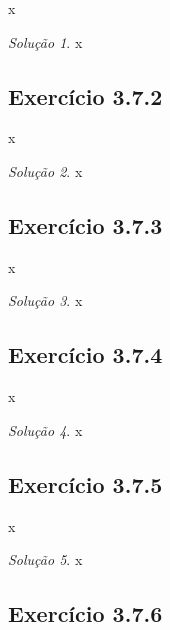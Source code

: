\documentclass[
]{latex/krantz}
\theoremstyle{definition}
\theoremstyle{definition}
\theoremstyle{definition}
\theoremstyle{definition}
\theoremstyle{remark}
\newtheorem*{solution}{Solução}
\begin{document}
x

\begin{solution}
x
\end{solution}

\hypertarget{exr3-7-2}{%
\subsection*{Exercício 3.7.2}\label{exr3-7-2}}

x

\begin{solution}
x
\end{solution}

\hypertarget{exr3-7-3}{%
\subsection*{Exercício 3.7.3}\label{exr3-7-3}}

x

\begin{solution}
x
\end{solution}

\hypertarget{exr3-7-4}{%
\subsection*{Exercício 3.7.4}\label{exr3-7-4}}

x

\begin{solution}
x
\end{solution}

\hypertarget{exr3-7-5}{%
\subsection*{Exercício 3.7.5}\label{exr3-7-5}}

x

\begin{solution}
x
\end{solution}

\hypertarget{exr3-7-6}{%
\subsection*{Exercício 3.7.6}\label{exr3-7-6}}
\end{document}
